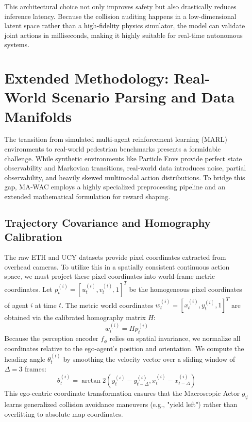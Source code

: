 \documentclass[conference]{IEEEtran}
\begin{document}
This architectural choice not only improves safety but also drastically reduces inference latency. Because the collision auditing happens in a low-dimensional latent space rather than a high-fidelity physics simulator, the model can validate joint actions in milliseconds, making it highly suitable for real-time autonomous systems.



\section{Extended Methodology: Real-World Scenario Parsing and Data Manifolds}\label{sec:extended}
The transition from simulated multi-agent reinforcement learning (MARL) environments to real-world pedestrian benchmarks presents a formidable challenge. While synthetic environments like Particle Envs provide perfect state observability and Markovian transitions, real-world data introduces noise, partial observability, and heavily skewed multimodal action distributions. To bridge this gap, MA-WAC employs a highly specialized preprocessing pipeline and an extended mathematical formulation for reward shaping.

\subsection{Trajectory Covariance and Homography Calibration}
The raw ETH and UCY datasets provide pixel coordinates extracted from overhead cameras. To utilize this in a spatially consistent continuous action space, we must project these pixel coordinates into world-frame metric coordinates. Let $p^{(i)}_t = [u_t^{(i)}, v_t^{(i)}, 1]^T$ be the homogeneous pixel coordinates of agent $i$ at time $t$. The metric world coordinates $w^{(i)}_t = [x_t^{(i)}, y_t^{(i)}, 1]^T$ are obtained via the calibrated homography matrix $H$:
\begin{equation}
w^{(i)}_t = H p^{(i)}_t
\end{equation}
Because the perception encoder $f_\phi$ relies on spatial invariance, we normalize all coordinates relative to the ego-agent's position and orientation. We compute the heading angle $\theta_t^{(i)}$ by smoothing the velocity vector over a sliding window of $\Delta = 3$ frames:
\begin{equation}
\theta_t^{(i)} = \arctan2(y_t^{(i)} - y_{t-\Delta}^{(i)}, x_t^{(i)} - x_{t-\Delta}^{(i)})
\end{equation}
This ego-centric coordinate transformation ensures that the Macroscopic Actor $g_\psi$ learns generalized collision avoidance maneuvers (e.g., "yield left") rather than overfitting to absolute map coordinates.
\end{document}
